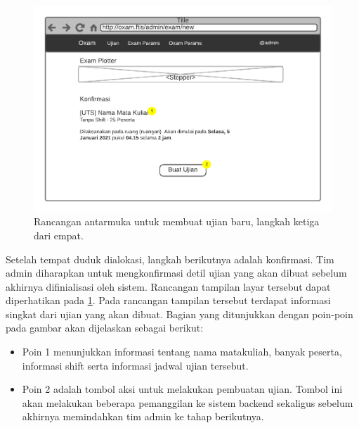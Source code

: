     \begin{figure}
        \centering
        \includegraphics{Gambar/mockups/Mockup--Admin - NewExam-Step 3.pdf}
        \caption{Rancangan antarmuka untuk membuat ujian baru, langkah ketiga dari empat.}
        \label{fig:mockup_admin_exam_create-3}
    \end{figure}
    Setelah tempat duduk dialokasi, langkah berikutnya adalah konfirmasi. Tim admin diharapkan untuk
    mengkonfirmasi detil ujian yang akan dibuat sebelum akhirnya difinialisasi oleh sistem. Rancangan tampilan
    layar tersebut dapat diperhatikan pada \ref{fig:mockup_admin_exam_create-3}. Pada rancangan tampilan
    tersebut terdapat informasi singkat dari ujian yang akan dibuat. Bagian yang ditunjukkan dengan poin-poin
    pada gambar akan dijelaskan sebagai berikut:
    
    \begin{itemize}
        \item Poin 1 menunjukkan informasi tentang nama matakuliah, banyak peserta, informasi shift serta informasi
            jadwal ujian tersebut.
            
        \item Poin 2 adalah tombol aksi untuk melakukan pembuatan ujian. Tombol ini akan melakukan beberapa pemanggilan
            ke sistem backend sekaligus sebelum akhirnya memindahkan tim admin ke tahap berikutnya.
    \end{itemize}
    
